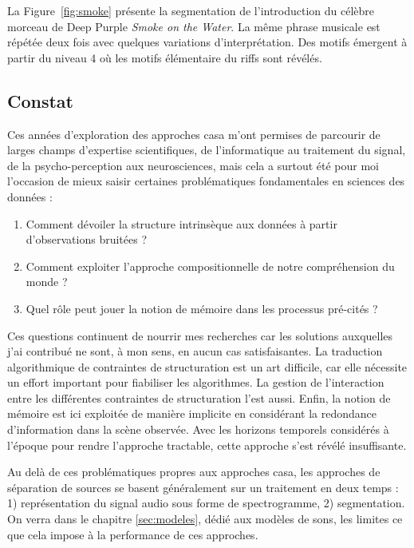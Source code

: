 La Figure~\ref{fig:smoke} présente la segmentation de l'introduction du célèbre morceau de Deep Purple \emph{Smoke on the Water}. La même phrase musicale est répétée deux fois avec quelques variations d'interprétation. Des motifs émergent à partir du niveau 4 où les motifs élémentaire du riffs sont révélés.

\subsection{Constat}

  Ces années d'exploration des approches casa m'ont permises de parcourir de larges champs d'expertise scientifiques, de l'informatique au traitement du signal, de la psycho-perception aux neurosciences, mais cela a surtout été pour moi l'occasion de mieux saisir certaines problématiques fondamentales en sciences des données :
  \begin{enumerate}
    \item Comment dévoiler la structure intrinsèque aux données à partir d'observations bruitées ?
    \item Comment exploiter l'approche compositionnelle de notre compréhension du monde ?
    \item Quel rôle peut jouer la notion de mémoire dans les processus pré-cités ?
  \end{enumerate}
  Ces questions continuent de nourrir mes recherches car les solutions auxquelles j'ai contribué ne sont, à mon sens, en aucun cas satisfaisantes. La traduction algorithmique de contraintes de structuration est un art difficile, car elle nécessite un effort important pour fiabiliser les algorithmes. La gestion de l'interaction entre les différentes contraintes de structuration l'est aussi. Enfin, la notion de mémoire est ici exploitée de manière implicite en considérant la redondance d'information dans la scène observée. Avec les horizons temporels considérés à l'époque pour rendre l'approche tractable, cette approche s'est révélé insuffisante.  %

  Au delà de ces problématiques propres aux approches casa, les approches de séparation de sources se basent généralement sur un traitement en deux temps : 1) représentation du signal audio sous forme de spectrogramme, 2) segmentation. On verra dans le chapitre \ref{sec:modeles}, dédié aux modèles de sons, les limites ce que cela impose à la performance de ces approches.

